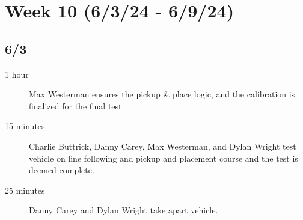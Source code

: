 \documentclass[11pt]{report}
\begin{document}
\section{Week 10 (6/3/24 - 6/9/24)}
\begin{adjustwidth}{0.5cm}{0cm}
\subsection*{6/3}
\begin{greylineformat}
\begin{description}
    \item [1 hour] Max Westerman ensures the pickup \& place logic, and the calibration is finalized for the final test.
    \item [15 minutes] Charlie Buttrick, Danny Carey, Max Westerman, and Dylan Wright test vehicle on line following and pickup and placement course and the test is deemed complete.
    \item [25 minutes] Danny Carey and Dylan Wright take apart vehicle. 
\end{description}\end{greylineformat}
\end{adjustwidth}


\SectionuseNormalSectionSizing
\SubSectionuseNormalSectionSizing
\end{document}
